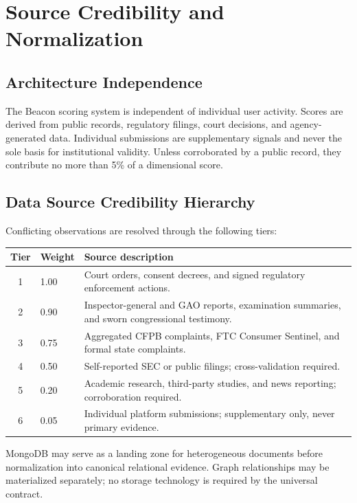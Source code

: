 \section{Source Credibility and Normalization}

\subsection{Architecture Independence}

The Beacon scoring system is independent of individual user activity. Scores
are derived from public records, regulatory filings, court decisions, and
agency-generated data. Individual submissions are supplementary signals and
never the sole basis for institutional validity. Unless corroborated by a
public record, they contribute no more than 5\% of a dimensional score.

\subsection{Data Source Credibility Hierarchy}

Conflicting observations are resolved through the following tiers:

\begin{center}
\begin{tabular}{cp{2cm}p{9.2cm}}
\toprule
Tier & Weight & Source description \\
\midrule
1 & 1.00 & Court orders, consent decrees, and signed regulatory enforcement actions. \\
2 & 0.90 & Inspector-general and GAO reports, examination summaries, and sworn congressional testimony. \\
3 & 0.75 & Aggregated CFPB complaints, FTC Consumer Sentinel, and formal state complaints. \\
4 & 0.50 & Self-reported SEC or public filings; cross-validation required. \\
5 & 0.20 & Academic research, third-party studies, and news reporting; corroboration required. \\
6 & 0.05 & Individual platform submissions; supplementary only, never primary evidence. \\
\bottomrule
\end{tabular}
\end{center}

MongoDB may serve as a landing zone for heterogeneous documents before
normalization into canonical relational evidence. Graph relationships may be
materialized separately; no storage technology is required by the universal
contract.


